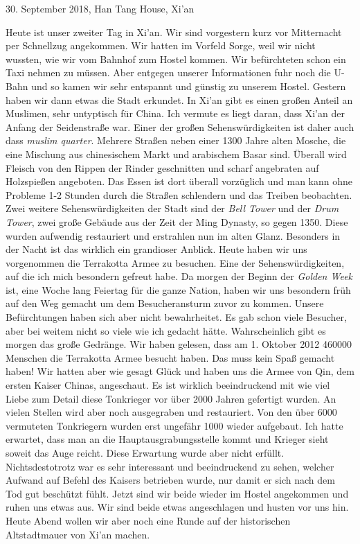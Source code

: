 \documentclass[11pt]{book}
\begin{document}
30. September 2018, Han Tang House, Xi'an

Heute ist unser zweiter Tag in Xi'an. Wir sind vorgestern kurz vor Mitternacht per Schnellzug angekommen. Wir 
hatten im Vorfeld Sorge, weil wir nicht wussten, wie wir vom Bahnhof zum Hostel kommen. Wir befürchteten schon
ein Taxi nehmen zu müssen. Aber entgegen unserer Informationen fuhr noch die U-Bahn und so kamen wir sehr entspannt 
und günstig zu unserem Hostel. Gestern haben wir dann etwas die Stadt erkundet. In Xi'an gibt es einen großen 
Anteil an Muslimen, sehr untyptisch für China. Ich vermute es liegt daran, dass Xi'an der Anfang der Seidenstraße 
war. Einer der großen Sehenswürdigkeiten ist daher auch dass \emph{muslim quarter}. Mehrere Straßen neben einer 
1300 Jahre alten Mosche, die eine Mischung aus chinesischem Markt und arabischem Basar sind. Überall wird Fleisch 
von den Rippen der Rinder geschnitten und scharf angebraten auf Holzspießen angeboten. Das Essen ist dort überall 
vorzüglich und man kann ohne Probleme 1-2 Stunden durch die Straßen schlendern und das Treiben beobachten. Zwei 
weitere Sehenswürdigkeiten der Stadt sind der \emph{Bell Tower} und der \emph{Drum Tower}, zwei große Gebäude 
aus der Zeit der Ming Dynasty, so gegen 1350. Diese wurden aufwendig restauriert und erstrahlen nun im alten Glanz.
Besonders in der Nacht ist das wirklich ein grandioser Anblick.
Heute haben wir uns vorgenommen die Terrakotta Armee zu besuchen. Eine der Sehenswürdigkeiten, auf die ich mich 
besondern gefreut habe. Da morgen der Beginn der \emph{Golden Week} ist, eine Woche lang Feiertag für die ganze Nation,
haben wir uns besondern früh auf den Weg gemacht um dem Besucheransturm zuvor zu kommen. Unsere Befürchtungen haben 
sich aber nicht bewahrheitet. Es gab schon viele Besucher, aber bei weitem nicht so viele wie ich gedacht hätte.
Wahrscheinlich gibt es morgen das große Gedränge. Wir haben gelesen, dass am 1. Oktober 2012 460000 Menschen die 
Terrakotta Armee besucht haben. Das muss kein Spaß gemacht haben! Wir hatten aber wie gesagt Glück und haben uns 
die Armee von Qin, dem ersten Kaiser Chinas, angeschaut. Es ist wirklich beeindruckend mit wie viel Liebe zum Detail 
diese Tonkrieger vor über 2000 Jahren gefertigt wurden. An vielen Stellen wird aber noch ausgegraben und restauriert. 
Von den über 6000 vermuteten Tonkriegern wurden erst ungefähr 1000 wieder aufgebaut. Ich hatte erwartet, dass man 
an die Hauptausgrabungsstelle kommt und Krieger sieht soweit das Auge reicht. Diese Erwartung wurde aber nicht 
erfüllt. Nichtsdestotrotz war es sehr interessant und beeindruckend zu sehen, welcher Aufwand auf Befehl des 
Kaisers betrieben wurde, nur damit er sich nach dem Tod gut beschützt fühlt. Jetzt sind wir beide wieder im Hostel 
angekommen und ruhen uns etwas aus. Wir sind beide etwas angeschlagen und husten vor uns hin. Heute Abend wollen wir 
aber noch eine Runde auf der historischen Altstadtmauer von Xi'an machen. 
\end{document}
